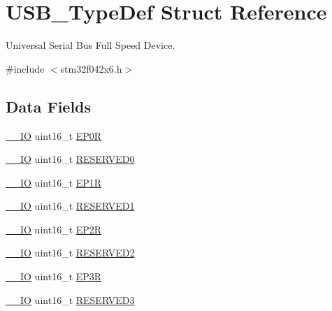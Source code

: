 \hypertarget{struct_u_s_b___type_def}{}\section{U\+S\+B\+\_\+\+Type\+Def Struct Reference}
\label{struct_u_s_b___type_def}


Universal Serial Bus Full Speed Device.  




{\ttfamily \#include $<$stm32f042x6.\+h$>$}

\subsection*{Data Fields}
\begin{DoxyCompactItemize}
\item 
\hyperlink{core__sc300_8h_aec43007d9998a0a0e01faede4133d6be}{\+\_\+\+\_\+\+IO} uint16\+\_\+t \hyperlink{struct_u_s_b___type_def_a325f0bdb1f81ce237dea2773bc26aed2}{E\+P0R}
\item 
\hyperlink{core__sc300_8h_aec43007d9998a0a0e01faede4133d6be}{\+\_\+\+\_\+\+IO} uint16\+\_\+t \hyperlink{struct_u_s_b___type_def_ab234cb4952ccf50c24a841b3f2f28a91}{R\+E\+S\+E\+R\+V\+E\+D0}
\item 
\hyperlink{core__sc300_8h_aec43007d9998a0a0e01faede4133d6be}{\+\_\+\+\_\+\+IO} uint16\+\_\+t \hyperlink{struct_u_s_b___type_def_a181159566b312dd1471e247e6a74b8ef}{E\+P1R}
\item 
\hyperlink{core__sc300_8h_aec43007d9998a0a0e01faede4133d6be}{\+\_\+\+\_\+\+IO} uint16\+\_\+t \hyperlink{struct_u_s_b___type_def_abd0cb7c1fef737616a25adb37ef909bd}{R\+E\+S\+E\+R\+V\+E\+D1}
\item 
\hyperlink{core__sc300_8h_aec43007d9998a0a0e01faede4133d6be}{\+\_\+\+\_\+\+IO} uint16\+\_\+t \hyperlink{struct_u_s_b___type_def_aaf056ff97c76de78e90701449c8cbf16}{E\+P2R}
\item 
\hyperlink{core__sc300_8h_aec43007d9998a0a0e01faede4133d6be}{\+\_\+\+\_\+\+IO} uint16\+\_\+t \hyperlink{struct_u_s_b___type_def_a44086b7a050f78b2148a60945e477293}{R\+E\+S\+E\+R\+V\+E\+D2}
\item 
\hyperlink{core__sc300_8h_aec43007d9998a0a0e01faede4133d6be}{\+\_\+\+\_\+\+IO} uint16\+\_\+t \hyperlink{struct_u_s_b___type_def_ac4d0c88deada778ef870d2f6d478768f}{E\+P3R}
\item 
\hyperlink{core__sc300_8h_aec43007d9998a0a0e01faede4133d6be}{\+\_\+\+\_\+\+IO} uint16\+\_\+t \hyperlink{struct_u_s_b___type_def_a73aa1eb05d9f4581a6efe7a8e919bcbf}{R\+E\+S\+E\+R\+V\+E\+D3}

\end{DoxyCompactItemize}

